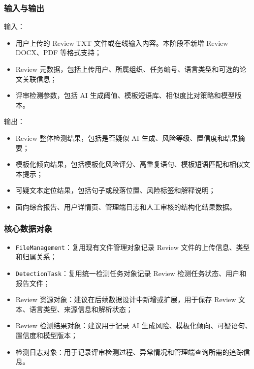 \subsubsection{输入与输出}
输入：
\begin{itemize}[leftmargin=2em]
    \item 用户上传的 Review TXT 文件或在线输入内容。本阶段不新增 Review DOCX、PDF 等格式支持；
    \item Review 元数据，包括上传用户、所属组织、任务编号、语言类型和可选的论文关联信息；
    \item 评审检测参数，包括 AI 生成阈值、模板短语库、相似度比对策略和模型版本。
\end{itemize}

输出：
\begin{itemize}[leftmargin=2em]
    \item Review 整体检测结果，包括是否疑似 AI 生成、风险等级、置信度和结果摘要；
    \item 模板化倾向结果，包括模板化风险评分、高重复语句、模板短语匹配和相似文本提示；
    \item 可疑文本定位结果，包括句子或段落位置、风险标签和解释说明；
    \item 面向综合报告、用户详情页、管理端日志和人工审核的结构化结果数据。
\end{itemize}

\subsubsection{核心数据对象}
\begin{itemize}[leftmargin=2em]
    \item \texttt{FileManagement}：复用现有文件管理对象记录 Review 文件的上传信息、类型和归属关系；
    \item \texttt{DetectionTask}：复用统一检测任务对象记录 Review 检测任务状态、用户和报告文件；
    \item Review 资源对象：建议在后续数据设计中新增或扩展，用于保存 Review 文本、语言类型、来源信息和解析状态；
    \item Review 检测结果对象：建议用于记录 AI 生成风险、模板化倾向、可疑语句、置信度和模型版本；
    \item 检测日志对象：用于记录评审检测过程、异常情况和管理端查询所需的追踪信息。
\end{itemize}

